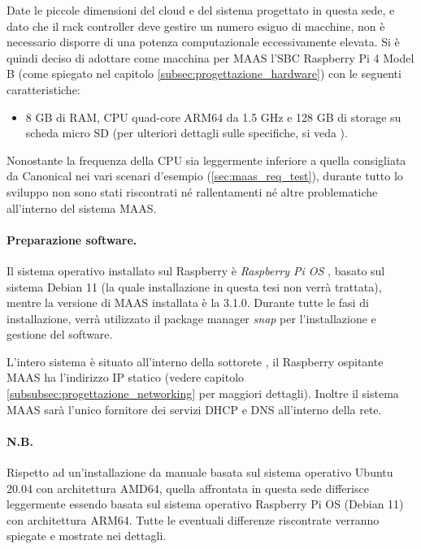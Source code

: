\bigskip
% 
Date le piccole dimensioni del cloud e del sistema progettato in questa sede, e dato che il rack controller deve gestire un numero esiguo di macchine, non è necessario disporre di una potenza computazionale eccessivamente elevata.
% 
Si è quindi deciso di adottare come macchina per MAAS l'SBC Raspberry Pi 4 Model B (come spiegato nel capitolo \ref{subsec:progettazione_hardware}) con le seguenti caratteristiche:
\begin{itemize}
    \item[] 8 GB di RAM, CPU quad-core ARM64 da 1.5 GHz e 128 GB di storage su scheda micro SD (per ulteriori dettagli sulle specifiche, si veda \cite{rasp_spec}).
\end{itemize}
% 
Nonostante la frequenza della CPU sia leggermente inferiore a quella consigliata da Canonical nei vari scenari d'esempio (\cref{sec:maas_req_test}), durante tutto lo sviluppo non sono stati riscontrati né rallentamenti né altre problematiche all'interno del sistema MAAS. 


\paragraph{Preparazione software.}
Il sistema operativo installato sul Raspberry è \emph{Raspberry Pi OS} \cite{rasp_os}, basato sul sistema Debian 11 (la quale installazione in questa tesi non verrà trattata), mentre la versione di MAAS installata è la 3.1.0.
% 
Durante tutte le fasi di installazione, verrà utilizzato il package manager \emph{snap} per l'installazione e gestione del software.

L'intero sistema è situato all'interno della sottorete , il Raspberry ospitante MAAS ha l'indirizzo IP statico  (vedere capitolo \ref{subsubsec:progettazione_networking} per maggiori dettagli).
%
Inoltre il sistema MAAS sarà l'unico fornitore dei servizi DHCP e DNS all'interno della rete.

\paragraph{N.B.} Rispetto ad un'installazione da manuale basata sul sistema operativo Ubuntu 20.04 con architettura AMD64, quella affrontata in questa sede differisce leggermente essendo basata sul sistema operativo Raspberry Pi OS (Debian 11) con architettura ARM64.
% 
Tutte le eventuali differenze riscontrate verranno spiegate e mostrate nei dettagli.

